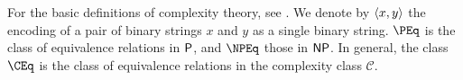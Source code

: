 For the basic definitions of complexity theory, see \autocite{ab09}.
We denote by $\pair{x}{y}$ the encoding of a pair of binary strings $x$ and $y$ as a single binary string.
%
%
%
%
%
$\PEq$ is the class of equivalence relations in $\P$, and $\NPEq$ those in $\NP$.
In general, the class $\CEq$ is the class of equivalence relations in the complexity class $\mathcal{C}$.


